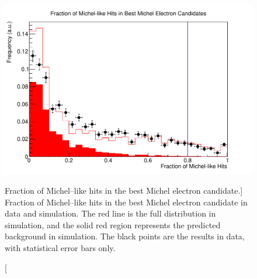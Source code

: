 \begin{figure}
	\centering
	\includegraphics[width=\textwidth]{figures/frac_michel.pdf}
	\caption
	[Fraction of Michel--like hits in the best Michel electron candidate.]
	{Fraction of Michel--like hits in the best Michel electron candidate in data
	and simulation. The red line is the full distribution in simulation, and the
	solid red region represents the predicted background in simulation. The black
	points are the results in data, with statistical error bars only.}
	\label{fig:michel_like_frac}
\end{figure}

